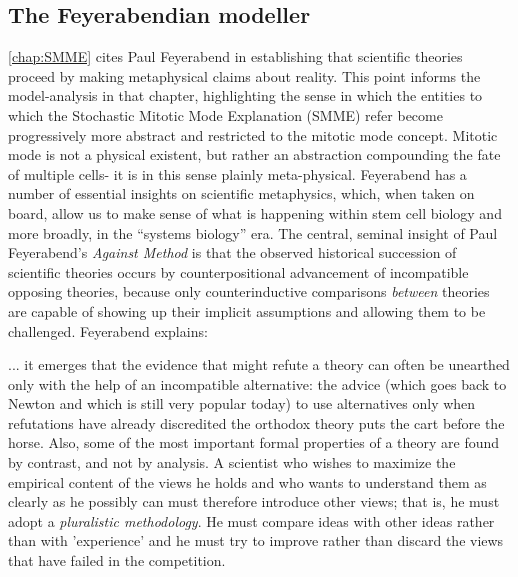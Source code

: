\subsection{The Feyerabendian modeller}
\label{sec:Feyerabend}
\autoref{chap:SMME} cites Paul Feyerabend in establishing that scientific theories proceed by making metaphysical claims about reality. This point informs the model-analysis in that chapter, highlighting the sense in which the entities to which the Stochastic Mitotic Mode Explanation (SMME) refer become progressively more abstract and restricted to the mitotic mode concept. Mitotic mode is not a physical existent, but rather an abstraction compounding the fate of multiple cells- it is in this sense plainly meta-physical. Feyerabend has a number of essential insights on scientific metaphysics, which, when taken on board, allow us to make sense of what is happening within stem cell biology and more broadly, in the ``systems biology'' era. The central, seminal insight of Paul Feyerabend's \textit{Against Method} is that the observed historical succession of scientific theories occurs by counterpositional advancement of incompatible opposing theories, because only counterinductive comparisons \textit{between} theories are capable of showing up their implicit assumptions and allowing them to be challenged. Feyerabend explains:

\begin{longquote}
... it emerges that the evidence that might refute a
theory can often be unearthed only with the help of an incompatible
alternative: the advice (which goes back to Newton and which is still
very popular today) to use alternatives only when refutations have
already discredited the orthodox theory puts the cart before the
horse. Also, some of the most important formal properties of a theory
are found by contrast, and not by analysis. A scientist who wishes to
maximize the empirical content of the views he holds and who wants
to understand them as clearly as he possibly can must therefore
introduce other views; that is, he must adopt a \textit{pluralistic methodology}.
He must compare ideas with other ideas rather than with
'experience' and he must try to improve rather than discard the views
that have failed in the competition.\cite[p.20]{Feyerabend1993}
\end{longquote}

